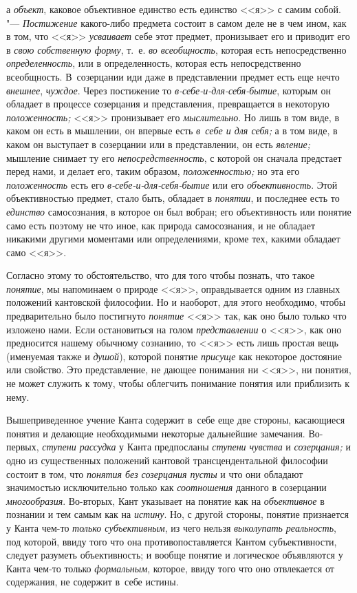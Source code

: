 а {\em объект}, каковое объективное единство есть единство <<я>> с самим собой. "---
{\em Постижение} какого-либо предмета состоит в самом деле не в чем ином, как
в том, что <<я>> {\em усваивает} себе этот предмет, пронизывает его и приводит его
в {\em свою собственную форму}, т.~е. {\em во всеобщность}, которая есть
непосредственно {\em определенность}, или в определенность, которая есть
непосредственно всеобщность. В~созерцании иди даже в представлении предмет
есть еще нечто {\em внешнее}, {\em чуждое}. Через постижение то
{\em в-себе-и-для-себя-бытие}, которым он обладает в процессе созерцания и
представления, превращается в некоторую {\em положенность;} <<я>> пронизывает
его {\em мыслительно}. Но лишь в том виде, в каком он есть в мышлении, он
впервые есть {\em в~себе и для себя;} а в том виде, в каком он выступает в
созерцании или в представлении, он есть {\em явление;} мышление снимает ту
его {\em непосредственность}, с которой он сначала предстает перед нами, и
делает его, таким образом, {\em положенностью;} но эта его {\em положенность}
есть его {\em в-себе-и-для-себя-бытие} или его {\em объективность}. Этой
объективностью предмет, стало быть, обладает в {\em понятии}, и последнее
есть то {\em единство} самосознания, в которое он был вобран; его
объективность или понятие само есть поэтому не что иное, как природа
самосознания, и не обладает никакими другими моментами или определениями,
кроме тех, какими обладает само <<я>>.

Согласно этому то обстоятельство, что для того чтобы познать, что такое
{\em понятие}, мы напоминаем о природе <<я>>, оправдывается одним из главных
положений кантовской философии. Но и наоборот, для этого необходимо, чтобы
предварительно было постигнуто {\em понятие} <<я>> так, как оно было только что
изложено нами. Если остановиться на голом {\em представлении} о <<я>>, как оно
предносится нашему обычному сознанию, то <<я>> есть лишь простая вещь
(именуемая также и {\em душой}), которой понятие {\em присуще} как некоторое
достояние или свойство. Это представление, не дающее понимания ни <<я>>, ни
понятия, не может служить к тому, чтобы облегчить понимание понятия или
приблизить к нему.

Вышеприведенное учение Канта содержит в~себе еще две стороны,
касающиеся понятия и делающие необходимыми некоторые дальнейшие замечания.
Во-первых, {\em ступени рассудка} у Канта предпосланы {\em ступени чувства} и
{\em созерцания;} и одно из существенных положений кантовой трансцендентальной
философии состоит в том, что {\em понятия без созерцания
пусты} и что они обладают значимостью исключительно только
как {\em соотношения} данного в созерцании {\em многообразия}.
Во-вторых, Кант указывает на понятие как на {\em объективное}
в познании и тем самым как на {\em истину}. Но, с
другой стороны, понятие признается у Канта чем-то {\em только субъективным},
из чего нельзя {\em выколупать реальность},
под которой, ввиду того что она противопоставляется Кантом
субъективности, следует разуметь объективность; и вообще понятие и
логическое объявляются у Канта чем-то только {\em формальным}, которое,
ввиду того что оно отвлекается от содержания, не содержит в~себе истины.

